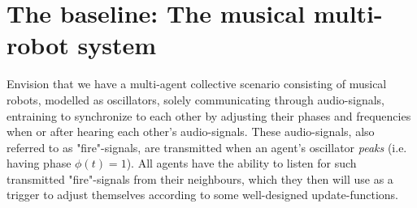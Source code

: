 \section{The baseline: The musical multi-robot system}

Envision that we have a multi-agent collective scenario consisting of musical robots, modelled as oscillators, solely communicating through audio-signals, entraining to synchronize to each other by adjusting their phases and frequencies when or after hearing each other's audio-signals. These audio-signals, also referred to as "fire"-signals, are transmitted when an agent's oscillator \textit{peaks} (i.e. having phase $\phi(t)=1$). All agents have the ability to listen for such transmitted "fire"-signals from their neighbours, which they then will use as a trigger to adjust themselves according to some well-designed update-functions.

